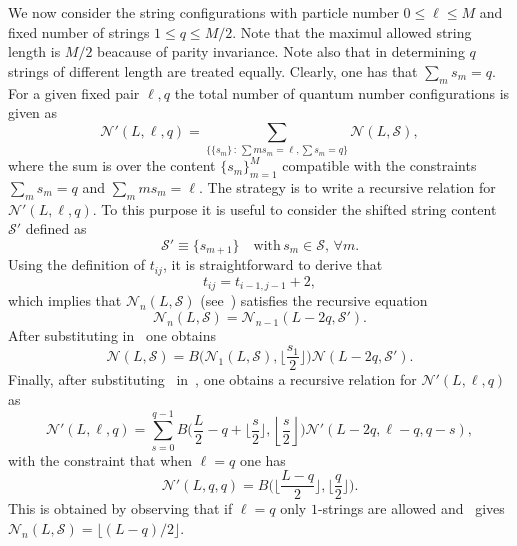 \documentclass[11pt]{iopart}
\begin{document}
We now consider the string configurations with particle number $0\le\ell\le M$ and 
fixed number of strings $1\le q\le M/2$. Note that the maximul allowed string length 
is $M/2$ beacause of parity invariance. Note also that in determining $q$ strings of 
different length are treated equally. Clearly, one has that $\sum_m s_m=q$. 
For a given fixed pair $\ell,q$ the total number of quantum number configurations 
is given as 
%
\begin{equation}
\label{NLlq}
{\mathcal N}'(L,\ell,q)=\sum\limits_{\{\{s_m\}\,:\, \sum m s_m=\ell, \sum s_m=q\}}
{\mathcal N}(L,{\mathcal S}),
\end{equation}
%
where the sum is over the content $\{s_m\}_{m=1}^M$ compatible with the constraints 
$\sum_m s_m=q$ and $\sum_m m s_m=\ell$. The strategy is to write a recursive relation 
for ${\mathcal N}'(L,\ell,q)$. To this purpose it is useful to consider the shifted 
string content ${\mathcal S}'$ defined as  
%
\begin{equation}
{\mathcal S}'\equiv \{s_{m+1}\}\quad\textrm{with}\, s_m\in{\mathcal S},\,\forall m.
\end{equation}
%
Using the definition of $t_{ij}$, it is straightforward to derive that  
%
\begin{equation}
t_{ij}=t_{i-1,j-1}+2,
\end{equation}
%
which implies that ${\mathcal N}_n(L,{\mathcal S})$ (see~) satisfies the 
recursive equation 
%
\begin{equation}
{\mathcal N}_n(L,{\mathcal S})={\mathcal N}_{n-1}(L-2q,{\mathcal S}'). 
\end{equation}
%
After substituting in~ one obtains 
%
\begin{equation}
\label{NLSr}
{\mathcal N}(L,{\mathcal S})=B\Big({\mathcal N}_1(L,{\mathcal S}),\Big\lfloor \frac{s_1}{2}
\Big\rfloor\Big){\mathcal N}(L-2q,{\mathcal S}'). 
\end{equation}
%
Finally, after substituting~ in~, one obtains a recursive relation 
for ${\mathcal N}'(L,\ell,q)$ as 
%
\begin{equation}
\label{NpLlq}
{\mathcal N}'(L,\ell,q)=\sum_{s=0}^{q-1}B\Big(\frac{L}{2}-q+\Big\lfloor\frac{s}{2}\Big\rfloor,
\left\lfloor\frac{s}{2}\right\rfloor\Big){\mathcal N}'\left(L-2q,\ell-q,
q-s\right), 
\end{equation}
%
with the constraint that when $\ell=q$ one has 
%
\begin{equation}
{\mathcal N}'(L,q,q)=B\Big(\Big\lfloor\frac{L-q}{2}\Big\rfloor,\Big\lfloor\frac{q}{2} 
\Big\rfloor\Big).
\end{equation}
%
This is obtained by observing that if $\ell=q$ only $1$-strings are allowed and~ 
gives ${\mathcal N}_n(L,{\mathcal S})=\lfloor (L-q)/2\rfloor$. 
\end{document}
